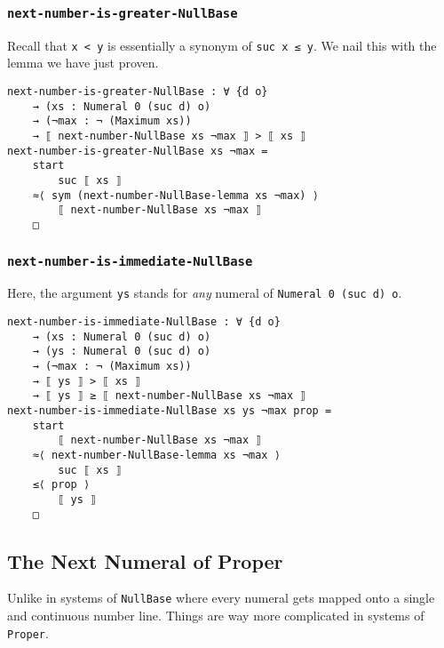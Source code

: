 \documentclass[\main/thesis.tex]{subfiles}
\begin{document}
\subsubsection{{\lstinline|next-number-is-greater-NullBase|}}

Recall that {\lstinline|x < y|} is essentially a synonym of {\lstinline|suc x ≤ y|}.
We nail this with the lemma we have just proven.

\begin{lstlisting}
next-number-is-greater-NullBase : ∀ {d o}
    → (xs : Numeral 0 (suc d) o)
    → (¬max : ¬ (Maximum xs))
    → ⟦ next-number-NullBase xs ¬max ⟧ > ⟦ xs ⟧
next-number-is-greater-NullBase xs ¬max =
    start
        suc ⟦ xs ⟧
    ≈⟨ sym (next-number-NullBase-lemma xs ¬max) ⟩
        ⟦ next-number-NullBase xs ¬max ⟧
    □
\end{lstlisting}

\subsubsection{{\lstinline|next-number-is-immediate-NullBase|}}

Here, the argument {\lstinline|ys|} stands for \textit{any} numeral of {\lstinline|Numeral 0 (suc d) o|}.

\begin{lstlisting}
next-number-is-immediate-NullBase : ∀ {d o}
    → (xs : Numeral 0 (suc d) o)
    → (ys : Numeral 0 (suc d) o)
    → (¬max : ¬ (Maximum xs))
    → ⟦ ys ⟧ > ⟦ xs ⟧
    → ⟦ ys ⟧ ≥ ⟦ next-number-NullBase xs ¬max ⟧
next-number-is-immediate-NullBase xs ys ¬max prop =
    start
        ⟦ next-number-NullBase xs ¬max ⟧
    ≈⟨ next-number-NullBase-lemma xs ¬max ⟩
        suc ⟦ xs ⟧
    ≤⟨ prop ⟩
        ⟦ ys ⟧
    □
\end{lstlisting}

\subsection{The Next Numeral of Proper}

Unlike in systems of {\lstinline|NullBase|} where every numeral gets mapped onto
a single and continuous number line.
Things are way more complicated in systems of {\lstinline|Proper|}.

\end{document}
